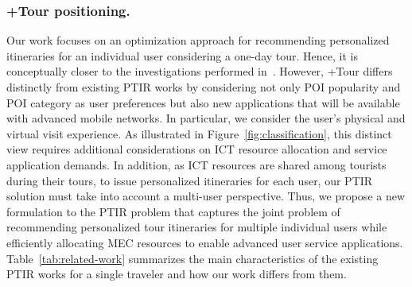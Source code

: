 {\subsubsection{+Tour positioning.}} 
{Our work focuses on an optimization approach for recommending personalized itineraries for an individual user considering a one-day tour. Hence, it is conceptually closer to the investigations performed in~\cite{choudhury-automatic:10,brilhante-where:13, yu-personalized:16,lim-personalized:18}. However, +Tour differs distinctly from existing PTIR works by considering not only POI popularity and POI category as user preferences but also new applications that will be available with advanced mobile networks. In particular, we consider the user's physical and virtual visit experience. As illustrated in Figure~\ref{fig:classification}, this distinct view requires additional considerations on ICT resource allocation and service application demands. In addition, as ICT resources are shared among tourists during their tours, to issue personalized itineraries for each user, our PTIR solution must take into account a multi-user perspective. Thus, we propose a new formulation to the PTIR problem that captures the joint problem of recommending personalized tour itineraries for multiple individual users while efficiently allocating MEC resources to enable advanced user service applications. Table~\ref{tab:related-work} summarizes the main characteristics of the existing PTIR works for a single traveler and how our work differs from them.}

